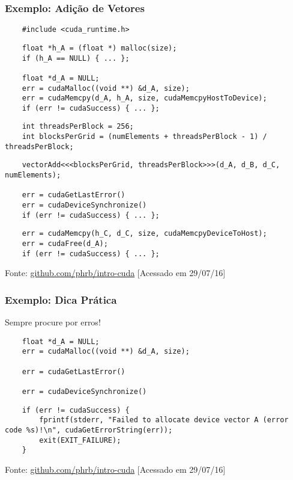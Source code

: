 \documentclass[10pt, compress, aspectratio=43, xcolor={table,usenames,dvipsnames}]{beamer}
\begin{document}
\begin{frame}[fragile]
    \frametitle{Exemplo: Adição de Vetores}
    \begin{verbatim}
    #include <cuda_runtime.h>
    \end{verbatim}

    \begin{verbatim}
    float *h_A = (float *) malloc(size);
    if (h_A == NULL) { ... };

    float *d_A = NULL;
    err = cudaMalloc((void **) &d_A, size);
    err = cudaMemcpy(d_A, h_A, size, cudaMemcpyHostToDevice);
    if (err != cudaSuccess) { ... };
    \end{verbatim}

    \begin{verbatim}
    int threadsPerBlock = 256;
    int blocksPerGrid = (numElements + threadsPerBlock - 1) / threadsPerBlock;
    \end{verbatim}

    \begin{verbatim}
    vectorAdd<<<blocksPerGrid, threadsPerBlock>>>(d_A, d_B, d_C, numElements);

    err = cudaGetLastError()
    err = cudaDeviceSynchronize()
    if (err != cudaSuccess) { ... };
    \end{verbatim}

    \begin{verbatim}
    err = cudaMemcpy(h_C, d_C, size, cudaMemcpyDeviceToHost);
    err = cudaFree(d_A);
    if (err != cudaSuccess) { ... };
    \end{verbatim}

    \vfill

    \begin{center}
        \tiny{Fonte: \url{github.com/phrb/intro-cuda} [Acessado em 29/07/16]}
    \end{center}
\end{frame}

\begin{frame}[fragile]
    \frametitle{Exemplo: Dica Prática}
    \alert{Sempre} procure por erros!

    \begin{verbatim}
    float *d_A = NULL;
    err = cudaMalloc((void **) &d_A, size);

    err = cudaGetLastError()

    err = cudaDeviceSynchronize()
    \end{verbatim}

    \begin{verbatim}
    if (err != cudaSuccess) {
        fprintf(stderr, "Failed to allocate device vector A (error code %s)!\n", cudaGetErrorString(err));
        exit(EXIT_FAILURE);
    }
    \end{verbatim}

    \begin{center}
        \tiny{Fonte: \url{github.com/phrb/intro-cuda} [Acessado em 29/07/16]}
    \end{center}
\end{frame}
\end{document}
